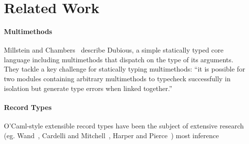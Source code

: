 \section{Related Work}

\paragraph{Multimethods} 
Millstein and Chambers~\cite{MS02}
describe Dubious, a simple statically typed core language including multimethods that
dispatch on the type of its arguments. They tackle a key challenge for statically typing
multimethods: ``it is possible for two modules containing arbitrary multimethods to typecheck
successfully in isolation but generate type errors when linked together.''~\cite{MS02}







\paragraph{Record Types} 
O'Caml-style extensible record types have been the subject of extensive research 
(eg. Wand~\cite{Wan89}, Cardelli and Mitchell~\cite{CM91}, Harper and Pierce~\cite{HP91})
most inference

